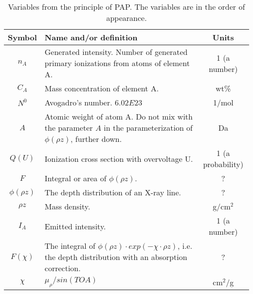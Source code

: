 \begin{table}[phtb]
    \begin{center}
        \caption{
            Variables from the principle of PAP.
            The variables are in the order of appearance.
        }
        \label{tab:quantitative:PAP:variables:principle}
        \begin{tabular}{cp{10cm}c}
            \hline
            \textbf{Symbol} & \textbf{Name and/or definition}                                                                                           & \textbf{Units}    \\

            \hline
            $n_A$           & Generated intensity. Number of generated primary ionizations from atoms of element A.                                     & 1 (a number)      \\
            $C_A$           & Mass concentration of element A.                                                                                          & wt\%              \\
            $N^0$           & Avogadro's number. $6.02E23$                                                                                              & 1/mol             \\
            $A$             & Atomic weight of atom A. Do not mix with the parameter $A$ in the parameterization of $\phi(\rho z)$, further down.       & Da                \\
            $Q(U)$          & Ionization cross section with overvoltage U.                                                                              & 1 (a probability) \\
            $F$             & Integral or area of $\phi(\rho z)$.                                                                                       & ?                 \\
            $\phi(\rho z)$  & The depth distribution of an X-ray line.                                                                                  & ?                 \\
            $\rho z$        & Mass density.                                                                                                             & g/cm$^2$          \\
            $I_A$           & Emitted intensity.                                                                                                        & 1 (a number)      \\
            $F(\chi)$       & The integral of $\phi (\rho z) \cdot exp(-\chi \cdot \rho z)$, i.e. the depth distribution with an absorption correction. & ?                 \\
            $\chi$          & $ \mu_\rho / sin(TOA) $                                                                                                   & cm$^2$/g          \\
            \hline
        \end{tabular}
    \end{center}
\end{table}
